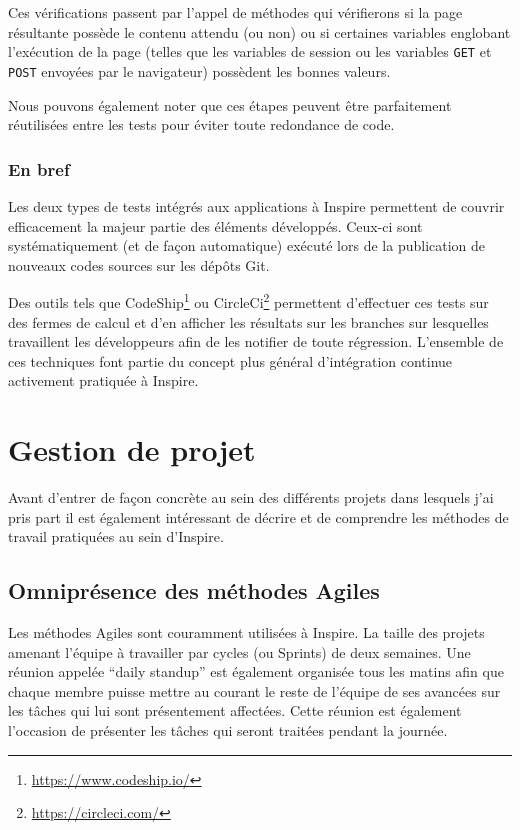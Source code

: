 \documentclass[12pt,a4paper]{book}
\begin{document}
Ces vérifications passent par l'appel de méthodes qui vérifierons si la page résultante possède le contenu attendu (ou non) ou si certaines variables englobant l'exécution de la page (telles que les variables de session ou les variables \texttt{GET} et \texttt{POST} envoyées par le navigateur) possèdent les bonnes valeurs.

Nous pouvons également noter que ces étapes peuvent être parfaitement réutilisées entre les tests pour éviter toute redondance de code.

\subsubsection{En bref}

Les deux types de tests intégrés aux applications à Inspire permettent de couvrir efficacement la majeur partie des éléments développés. Ceux-ci sont systématiquement (et de façon automatique) exécuté lors de la publication de nouveaux codes sources sur les dépôts Git.

Des outils tels que CodeShip\footnote{\url{https://www.codeship.io/}} ou CircleCi\footnote{\url{https://circleci.com/}} permettent d'effectuer ces tests sur des fermes de calcul et d'en afficher les résultats sur les branches sur lesquelles travaillent les développeurs afin de les notifier de toute régression. L'ensemble de ces techniques font partie du concept plus général d'intégration continue activement pratiquée à Inspire.

\section{Gestion de projet}

Avant d'entrer de façon concrète au sein des différents projets dans lesquels j'ai pris part il est également intéressant de décrire et de comprendre les méthodes de travail pratiquées au sein d'Inspire.

\subsection{Omniprésence des méthodes Agiles}

Les méthodes Agiles sont couramment utilisées à Inspire. La taille des projets amenant l'équipe à travailler par cycles (ou Sprints) de deux semaines. Une réunion appelée ``daily standup'' est également organisée tous les matins afin que chaque membre puisse mettre au courant le reste de l'équipe de ses avancées sur les tâches qui lui sont présentement affectées. Cette réunion est également l'occasion de présenter les tâches qui seront traitées pendant la journée.
\end{document}
